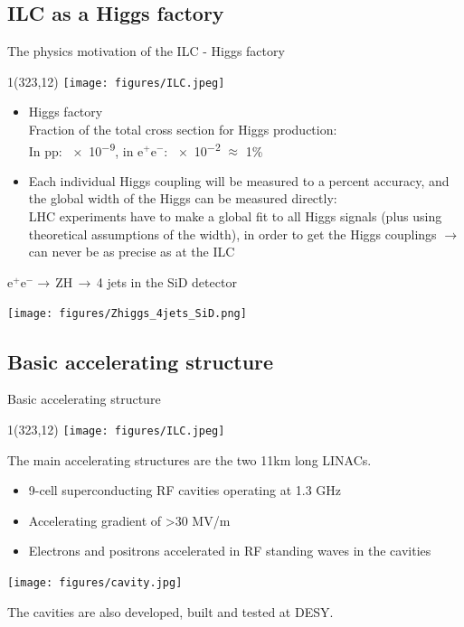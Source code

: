 \documentclass[xcolor={dvipsnames}]{beamer}
\newcommand{\ilclogo}{
  \setlength{\TPHorizModule}{1pt}
  \setlength{\TPVertModule}{1pt}
  \begin{textblock}{1}(323,12)
   \texttt{[image: figures/ILC.jpeg]}
  \end{textblock}
}
\begin{document}
\subsection{ILC as a Higgs factory}
\begin{frame}{The physics motivation of the ILC - Higgs factory}
\ilclogo
\begin{itemize}
\item Higgs factory\\
Fraction of the total cross section for Higgs production:\\
In pp: \num{e-9}, in e$^+$e$^-$: \num{e-2} $\approx$ 1\%
\item Each individual Higgs coupling will be measured to a percent accuracy, and the global width of the Higgs can be measured directly:\\LHC experiments have to make a global fit to all Higgs signals (plus using theoretical assumptions of the width), in order to get the Higgs couplings $ \rightarrow$ can never be as precise as at the ILC
\end{itemize}
\end{frame}

\begin{frame}[label=ZH_event_display]{e$^+$e$^-\rightarrow$\,ZH\,$\rightarrow$\,4 jets in the SiD detector}
 \begin{center}
   \texttt{[image: figures/Zhiggs\_4jets\_SiD.png]}\\
 \hyperlink{HitsEcalEndcaps}{}
 \end{center}
\end{frame}


\subsection{Basic accelerating structure}
\begin{frame}{Basic accelerating structure}
\ilclogo
The main accelerating structures are the two 11km long LINACs.
\begin{itemize}
\item 9-cell superconducting RF cavities operating at 1.3 GHz 
\item Accelerating gradient of >30 MV/m
\item Electrons and positrons accelerated in RF standing waves in the cavities 
\end{itemize}
\begin{center}
\texttt{[image: figures/cavity.jpg]}
\end{center}
The cavities are also developed, built and tested at DESY.
\end{frame}
\end{document}
